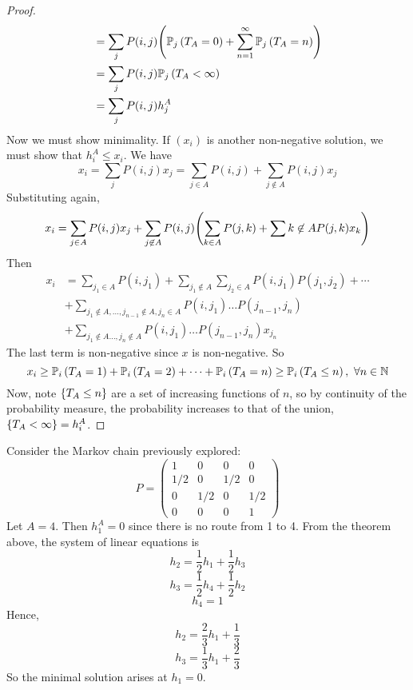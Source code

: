 \begin{proof}
\begin{align*}
		                       & = \sum_j P(i,j) \qty( \mathbb{P}_{j}\left({T_A = 0}\right) + \sum_{n=1}^\infty \mathbb{P}_{j}\left({T_A = n}\right) )                                            \\
		                       & = \sum_j P(i,j) \mathbb{P}_{j}\left({T_A < \infty}\right)                                                                                     \\
		                       & = \sum_j P(i,j) h_j^A
	\end{align*}
	Now we must show minimality.
	If \( (x_i) \) is another non-negative solution, we must show that \( h_i^A \leq x_i \).
	We have
	\[
		x_i = \sum_j P(i,j) x_j = \sum_{j \in A} P(i,j) + \sum_{j \not\in A} P(i,j) x_j
	\]
	Substituting again,
	\[
		x_i = \sum_{j \in A} P(i,j) x_j + \sum_{j \not\in A} P(i,j) \qty( \sum_{k \in A} P(j,k) + \sum{k \not\in A} P(j,k) x_k )
	\]
	Then
	\begin{align*}
		x_i & = \sum_{j_1 \in A} P(i,j_1) + \sum_{j_1 \not\in A} \sum_{j_2 \in A} P(i,j_1)P(j_1,j_2) + \cdots \\
		    & + \sum_{j_1 \not\in A, \dots, j_{n-1} \not\in A, j_n \in A} P(i,j_1)\dots P(j_{n-1},j_n)        \\
		    & + \sum_{j_1 \not\in A \dots, j_n \not\in A} P(i,j_1)\dots P(j_{n-1},j_n) x_{j_n}
	\end{align*}
	The last term is non-negative since \( x \) is non-negative.
	So
	\[
		x_i \geq \mathbb{P}_{i}\left({T_A = 1}\right) + \mathbb{P}_{i}\left({T_A = 2}\right) + \dots + \mathbb{P}_{i}\left({T_A = n}\right) \geq \mathbb{P}_{i}\left({T_A \leq n}\right),\ \forall n \in \mathbb N
	\]
	Now, note \( \qty{T_A \leq n} \) are a set of increasing functions of \( n \), so by continuity of the probability measure, the probability increases to that of the union, \( \qty{T_A < \infty} = h_i^A \).
\end{proof}
\begin{example}
	Consider the Markov chain previously explored:
	\[
		P = \begin{pmatrix}
			1   & 0   & 0   & 0   \\
			1/2 & 0   & 1/2 & 0   \\
			0   & 1/2 & 0   & 1/2 \\
			0   & 0   & 0   & 1
		\end{pmatrix}
	\]
	Let \( A = \qty{4} \).
	Then \( h_1^A = 0 \) since there is no route from 1 to 4.
	From the theorem above, the system of linear equations is
	\[
		h_2 = \frac{1}{2} h_1 + \frac{1}{2} h_3
	\]
	\[
		h_3 = \frac{1}{2} h_4 + \frac{1}{2} h_2
	\]
	\[
		h_4 = 1
	\]
	Hence,
	\[
		h_2 = \frac{2}{3} h_1 + \frac{1}{3}
	\]
	\[
		h_3 = \frac{1}{3} h_1 + \frac{2}{3}
	\]
	So the minimal solution arises at \( h_1 = 0 \).
\end{example}

